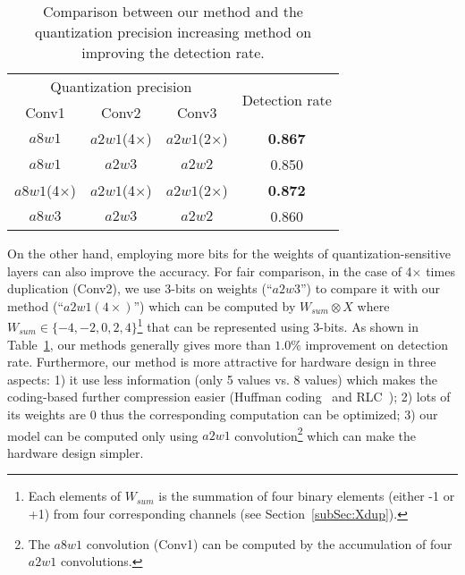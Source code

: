 \documentclass[10pt,twocolumn,letterpaper]{article}
\begin{document}
\begin{table}[!h]
	\centering
	\caption{Comparison between our method and the quantization precision increasing method on improving the detection rate.}
	\label{tab:exp_improv_comp}
	\begin{tabular}{c|c|c|c}
		
		\hline
		\multicolumn{3}{c|}{Quantization precision} &\multirow{2}{*}{Detection rate} \\
		\cline{1-3}
		{Conv1} & {Conv2}            & {Conv3}              & \\
		\hline\hline
		{$a8w1$}     &{$a2w1$(4$\times$)}            &{$a2w1$(2$\times$)}        &\textbf{0.867}          \\
{$a8w1$}     &{$a2w3$}                &{$a2w2$}            &{0.850}          \\
		\hline
		{$a8w1$(4$\times$)} &{$a2w1$(4$\times$)}            &{$a2w1$(2$\times$)}        &\textbf{0.872}          \\
{$a8w3$}     &{$a2w3$}                &{$a2w2$}            &{0.860}          \\


		\hline	
	\end{tabular}
\end{table}

On the other hand, employing more bits for the weights of quantization-sensitive layers can also improve the accuracy. For fair comparison, in the case of 4$\times$ times duplication (\eg Conv2), we use 3-bits on weights (``$a2w3$'') to compare it with our method (``$a2w1(4\times)$'') which can be computed by $W_{sum}\otimes X$ where $W_{sum}\in \{-4,-2,0,2,4\}$\footnote{Each elements of  $W_{sum}$ is the summation of four binary elements (either -1 or +1) from four corresponding channels (see Section~\ref{subSec:Xdup}).} that can be represented using 3-bits.  As shown in Table~\ref{tab:exp_improv_comp}, our methods generally gives more than $1.0\%$ improvement on detection rate. Furthermore, our method is more attractive for hardware design in three aspects: 1) it use less information (only 5 values vs. 8 values) which makes the coding-based further compression easier (\eg Huffman coding~\cite{DeepCompression} and RLC~\cite{RLC}); 2) lots of its weights are 0 thus the corresponding computation can be optimized; 3) our model can be computed only using  $a2w1$ convolution\footnote{The $a8w1$ convolution (Conv1) can be computed by the accumulation of four $a2w1$ convolutions.} which can make the hardware design simpler.
\end{document}
